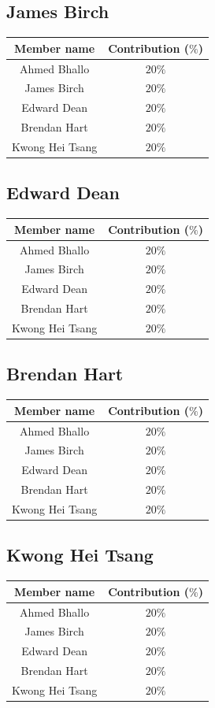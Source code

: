 \documentclass[12pt]{article}
\begin{document}
\subsection{James Birch}
\begin{tabular}{|c|c|} \hline
\textbf{Member name} & \textbf{Contribution ($\%$)}\\ \hline
Ahmed Bhallo & $20\%$ \\ \hline
James Birch & $20\%$ \\ \hline
Edward Dean & $20\%$ \\ \hline
Brendan Hart & $20\%$ \\ \hline
Kwong Hei Tsang & $20\%$ \\ \hline
\end{tabular}
\subsection{Edward Dean}
\begin{tabular}{|c|c|} \hline
\textbf{Member name} & \textbf{Contribution ($\%$)}\\ \hline
Ahmed Bhallo & $20\%$ \\ \hline
James Birch & $20\%$ \\ \hline
Edward Dean & $20\%$ \\ \hline
Brendan Hart & $20\%$ \\ \hline
Kwong Hei Tsang & $20\%$ \\ \hline
\end{tabular}
\subsection{Brendan Hart}
\begin{tabular}{|c|c|} \hline
\textbf{Member name} & \textbf{Contribution ($\%$)}\\ \hline
Ahmed Bhallo & $20\%$ \\ \hline
James Birch & $20\%$ \\ \hline
Edward Dean & $20\%$ \\ \hline
Brendan Hart & $20\%$ \\ \hline
Kwong Hei Tsang & $20\%$ \\ \hline
\end{tabular}
\subsection{Kwong Hei Tsang}
\begin{tabular}{|c|c|} \hline
\textbf{Member name} & \textbf{Contribution ($\%$)}\\ \hline
Ahmed Bhallo & $20\%$ \\ \hline
James Birch & $20\%$ \\ \hline
Edward Dean & $20\%$ \\ \hline
Brendan Hart & $20\%$ \\ \hline
Kwong Hei Tsang & $20\%$ \\ \hline
\end{tabular}
\end{document}

